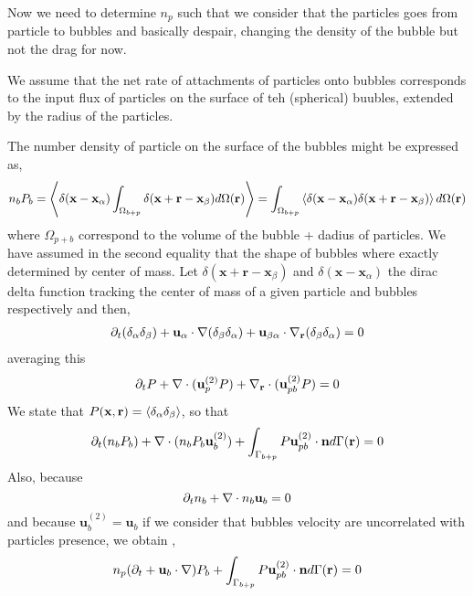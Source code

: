 \documentclass[12pt]{My_preprint}
\begin{document}
Now we need to determine $n_p$ such that we consider that the particles goes from particle to bubbles and basically despair, changing the density of the bubble but not the drag for now. 


We assume that the net rate of attachments of particles onto bubbles corresponds to the input flux of particles on the surface of teh (spherical) buubles, extended by the radius of the particles. 

The number density of particle on the surface of the bubbles might be expressed as, 
\begin{equation}
    n_b P_b 
    = 
    \left<\delta(\textbf{x}-\textbf{x}_\alpha) \int_{\Omega_{b+p}} \delta(\textbf{x} + \textbf{r} - \textbf{x}_\beta) d\Omega(\textbf{r})\right>
    = 
    \int_{\Omega_{b+p}}\left<\delta(\textbf{x}-\textbf{x}_\alpha)  \delta(\textbf{x} + \textbf{r} - \textbf{x}_\beta) \right>d\Omega(\textbf{r})
\end{equation}
where $\Omega_{p+b}$ correspond to the volume of the bubble + dadius of particles. 
We have assumed in the second equality that the shape of bubbles where exactly determined by center of mass. 
Let $\delta(\textbf{x} +\textbf{r}- \textbf{x}_\beta)$ and $\delta(\textbf{x} - \textbf{x}_\alpha)$ the dirac delta function tracking the center of mass of a given particle and bubbles respectively and then, 
\begin{align}
    \partial_t (\delta_\alpha\delta_\beta)
    + \textbf{u}_\alpha \cdot \mathbf{\nabla} (\delta_\beta \delta_\alpha) 
    + \textbf{u}_{\beta\alpha} \cdot {\mathbf{\nabla}_\textbf{r}} (\delta_\beta \delta_\alpha) = 0
\end{align}
averaging this 
\begin{align}
    \partial_t P
    +  \mathbf{\nabla}\cdot (\textbf{u}_p^{(2)} P) 
    +  {\mathbf{\nabla}_\textbf{r}}\cdot (\textbf{u}_{pb}^{(2)} P) = 0
\end{align}
We state that $P(\textbf{x},\textbf{r}) = \left<\delta_\alpha \delta_\beta\right>$, so that 
\begin{equation}
    \partial_t (n_bP_b)
    +  \mathbf{\nabla}\cdot (n_b P_b \textbf{u}_b^{(2)} )
    + \int_{\Gamma_{b+p}} P \textbf{u}_{pb}^{(2)}\cdot \textbf{n} d\Gamma(\textbf{r})
    = 0 
\end{equation}
Also, because 
\begin{equation}
    \partial_t n_b + \mathbf{\nabla}\cdot n_b \textbf{u}_b = 0 
\end{equation}
and because $\textbf{u}_b^{(2)} = \textbf{u}_b$ if we consider that bubbles velocity are uncorrelated with particles presence, we obtain ,
\begin{equation}
    n_p (\partial_t 
    +  \textbf{u}_b \cdot \mathbf{\nabla} ) P_b
    + \int_{\Gamma_{b+p}} P \textbf{u}_{pb}^{(2)}\cdot \textbf{n} d\Gamma(\textbf{r})
    = 0 
\end{equation}
\end{document}
